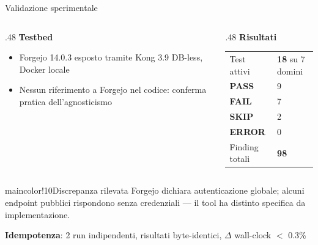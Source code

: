 
\begin{frame}{Validazione sperimentale}
  \begin{columns}
    \begin{column}{.48\textwidth}
      \textbf{Testbed}
      \vspace{-0.3em}
      \begin{itemize}
        \setlength{\itemsep}{0.3em}
        \item \alert{Forgejo} 14.0.3 esposto tramite \alert{Kong} 3.9 DB-less, Docker locale

        \item Nessun riferimento a Forgejo nel codice: conferma pratica dell'agnosticismo
      \end{itemize}
    \end{column}

    \begin{column}{.48\textwidth}
      \textbf{Risultati}
      \begin{center}
        \begin{tabular}{@{}ll@{}}
          Test attivi                               & \textbf{18} su 7 domini \\[0.1em]
          \textcolor{green!55!black}{\textbf{PASS}} & 9                       \\
          \textcolor{red!60!black}{\textbf{FAIL}}   & 7                       \\
          \textcolor{gray!60!black}{\textbf{SKIP}}  & 2                       \\
          \textbf{ERROR}                            & 0                       \\[0.1em]
          Finding totali                            & \textbf{98}             \\
        \end{tabular}
      \end{center}
    \end{column}
  \end{columns}

  \vspace{-0.3em}
  \begin{colorblock}[black!80]{maincolor!10}{Discrepanza rilevata}
    \footnotesize Forgejo dichiara autenticazione globale; alcuni endpoint pubblici rispondono senza credenziali — il tool ha distinto specifica da implementazione.
  \end{colorblock}

  \vspace{-0.3em}
  \begin{center}
    \footnotesize \textbf{Idempotenza}: 2 run indipendenti, risultati \alert{byte-identici}, $\Delta$ wall-clock \alert{$<$ 0.3\%}
  \end{center}
\end{frame}